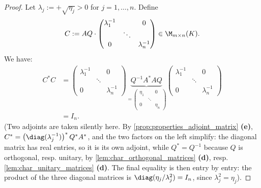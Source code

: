 \begin{proof}
Let $\lambda_j := +\sqrt{\eta_j} > 0$ for $j = 1, \dots, n$.
Define
\[
C := A Q \cdot \begin{pmatrix} \lambda_1^{-1} & & 0 \\ & \ddots & \\ 0 & & \lambda_n^{-1} \end{pmatrix} \in \M_{m \times n}(K).
\]
We have:
\begin{align*}
C^* C &= \begin{pmatrix} \lambda_1^{-1} & & 0 \\ & \ddots & \\ 0 & & \lambda_n^{-1} \end{pmatrix} \underbrace{Q^{-1} A^* A Q}_{=\begin{pmatrix} \eta_1 & & 0 \\ & \ddots & \\ 0 & & \eta_n \end{pmatrix}} \begin{pmatrix} \lambda_1^{-1} & & 0 \\ & \ddots & \\ 0 & & \lambda_n^{-1} \end{pmatrix} \\
&= I_n.
\end{align*}
(Two adjoints are taken silently here. By \cref{prop:properties_adjoint_matrix} \textbf{(e)}, $C^* = \left(\diag(\lambda_j^{-1})\right)^* Q^* A^*$, and the two factors on the left simplify: the diagonal matrix has real entries, so it is its own adjoint, while $Q^* = Q^{-1}$ because $Q$ is orthogonal, resp. unitary, by \cref{lem:char_orthogonal_matrices} \textbf{(d)}, resp. \cref{lem:char_unitary_matrices} \textbf{(d)}. The final equality is then entry by entry: the product of the three diagonal matrices is $\diag(\eta_j / \lambda_j^2) = I_n$, since $\lambda_j^2 = \eta_j$).


\end{proof}
